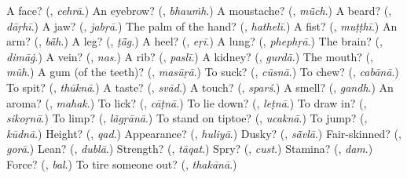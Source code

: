 \begin{tcolorbox}[breakable,colback=teal!4,colframe=teal!35!black,title={Before you move on}]
A face? (\textbf{}, \emph{cehrā}.) An eyebrow? (\textbf{}, \emph{bhauṁh}.) A moustache? (\textbf{}, \emph{mū̃ch}.) A beard? (\textbf{}, \emph{dāṛhī}.) A jaw? (\textbf{}, \emph{jabṛā}.) The palm of the hand? (\textbf{}, \emph{hathelī}.) A fist? (\textbf{}, \emph{muṭṭhī}.) An arm? (\textbf{}, \emph{bā̃h}.) A leg? (\textbf{}, \emph{ṭā̃g}.) A heel? (\textbf{}, \emph{eṛī}.) A lung? (\textbf{}, \emph{phephṛā}.) The brain? (\textbf{}, \emph{dimāġ}.) A vein? (\textbf{}, \emph{nas}.) A rib? (\textbf{}, \emph{paslī}.) A kidney? (\textbf{}, \emph{gurdā}.) The mouth? (\textbf{}, \emph{mũh}.) A gum (of the teeth)? (\textbf{}, \emph{masūṛā}.) To suck? (\textbf{}, \emph{cūsnā}.) To chew? (\textbf{}, \emph{cabānā}.) To spit? (\textbf{}, \emph{thūknā}.) A taste? (\textbf{}, \emph{svād}.) A touch? (\textbf{}, \emph{sparś}.) A smell? (\textbf{}, \emph{gandh}.) An aroma? (\textbf{}, \emph{mahak}.) To lick? (\textbf{}, \emph{cāṭnā}.) To lie down? (\textbf{}, \emph{leṭnā}.) To draw in? (\textbf{}, \emph{sikoṛnā}.) To limp? (\textbf{}, \emph{lãgṛānā}.) To stand on tiptoe? (\textbf{}, \emph{ucaknā}.) To jump? (\textbf{}, \emph{kūdnā}.) Height? (\textbf{}, \emph{qad}.) Appearance? (\textbf{}, \emph{huliyā}.) Dusky? (\textbf{}, \emph{sā̃vlā}.) Fair-skinned? (\textbf{}, \emph{gorā}.) Lean? (\textbf{}, \emph{dublā}.) Strength? (\textbf{}, \emph{tāqat}.) Spry? (\textbf{}, \emph{cust}.) Stamina? (\textbf{}, \emph{dam}.) Force? (\textbf{}, \emph{bal}.) To tire someone out? (\textbf{}, \emph{thakānā}.)
\end{tcolorbox}
